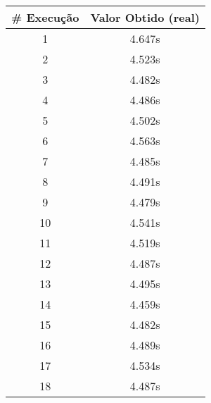 \documentclass[11pt]{article}
\begin{document}
\begin{table}[!h]
\begin{center}
\begin{minipage}{0.48\textwidth}
\begin{tabular}{| c | c |}
				\textbf{\# Execução} &  \textbf{Valor Obtido (real)} \\ \hline
				1 & 4.647s \\ \hline
				2 & 4.523s \\ \hline
				3 & 4.482s \\ \hline
				4 & 4.486s \\ \hline
				5 & 4.502s \\ \hline
				6 & 4.563s \\ \hline
				7 & 4.485s \\ \hline
				8 & 4.491s \\ \hline
				9 & 4.479s \\ \hline
				10 & 4.541s \\ \hline
				11 & 4.519s \\ \hline
				12 & 4.487s \\ \hline
				13 & 4.495s \\ \hline
				14 & 4.459s \\ \hline
				15 & 4.482s \\ \hline
				16 & 4.489s \\ \hline
				17 & 4.534s \\ \hline
				18 & 4.487s \\ \hline
			\end{tabular}
		\end{minipage}
	\end{center}
\end{table}

\pagebreak
\end{document}
